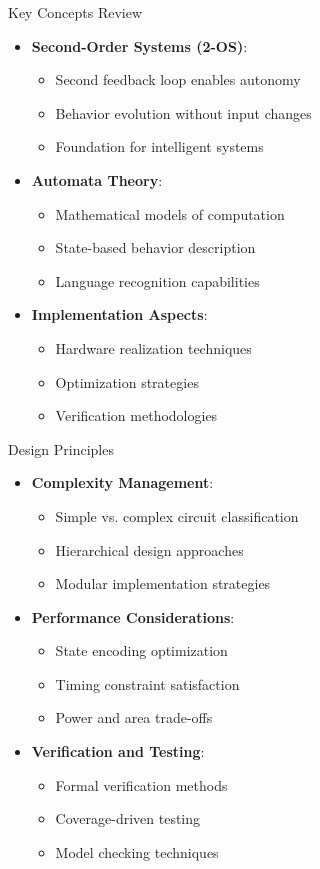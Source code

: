 \documentclass[aspectratio=169,11pt]{beamer}
\newcommand{\concept}[1]{\textbf{\color{accentcolor}#1}}
\begin{document}
\begin{frame}{Key Concepts Review}
\begin{itemize}
\item \concept{Second-Order Systems (2-OS)}:
\begin{itemize}
\item Second feedback loop enables autonomy
\item Behavior evolution without input changes
\item Foundation for intelligent systems
\end{itemize}
\vspace{0.3cm}
\item \concept{Automata Theory}:
\begin{itemize}
\item Mathematical models of computation
\item State-based behavior description
\item Language recognition capabilities
\end{itemize}
\vspace{0.3cm}
\item \concept{Implementation Aspects}:
\begin{itemize}
\item Hardware realization techniques
\item Optimization strategies
\item Verification methodologies
\end{itemize}
\end{itemize}
\end{frame}

\begin{frame}{Design Principles}
\begin{itemize}
\item \concept{Complexity Management}:
\begin{itemize}
\item Simple vs. complex circuit classification
\item Hierarchical design approaches
\item Modular implementation strategies
\end{itemize}
\vspace{0.3cm}
\item \concept{Performance Considerations}:
\begin{itemize}
\item State encoding optimization
\item Timing constraint satisfaction
\item Power and area trade-offs
\end{itemize}
\vspace{0.3cm}
\item \concept{Verification and Testing}:
\begin{itemize}
\item Formal verification methods
\item Coverage-driven testing
\item Model checking techniques
\end{itemize}
\end{itemize}
\end{frame}
\end{document}
